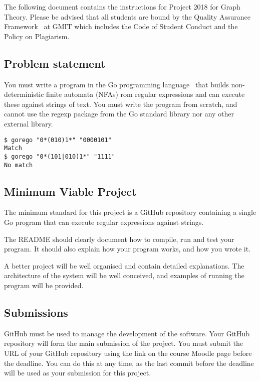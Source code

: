 \documentclass[12pt, a4paper]{article}
\title{\projectname}
\author{\modulename}
\date{Due: \duedate}
\newcommand{\modulename}{Graph Theory}
\newcommand{\projectyear}{2018}
\newcommand{\projectname}{Project \projectyear}
\begin{document}
\maketitle

\noindent
The following document contains the instructions for \projectname{} for \modulename{}.
Please be advised that all students are bound by the Quality Assurance Framework~\cite{gmitqaf} at GMIT which includes the Code of Student Conduct and the Policy on Plagiarism.

\subsection*{Problem statement}
You must write a program in the Go programming language~\cite{golang} that builds non-deterministic finite automata (NFAs) rom regular expressions and can execute these against strings of text.
You must write the program from scratch, and cannot use the regexp package from the Go standard library nor any other external library.

\begin{verbatim}
$ gorego "0*(010)1*" "0000101"
Match
$ gorego "0*(101|010)1*" "1111"
No match    
\end{verbatim}


\subsection*{Minimum Viable Project}
The minimum standard for this project is a GitHub repository containing a single Go program that can execute regular expressions against strings.

The README should clearly document how to compile, run and test your program.
It should also explain how your program works, and how you wrote it.

A better project will be well organised and contain detailed explanations.
The architecture of the system will be well conceived, and examples of running the program will be provided.


\subsection*{Submissions}
GitHub must be used to manage the development of the software.
Your GitHub repository will form the main submission of the project.
You must submit the URL of your GitHub repository using the link on the course Moodle page before the deadline.
You can do this at any time, as the last commit before the deadline will be used as your submission for this project.
\end{document}
